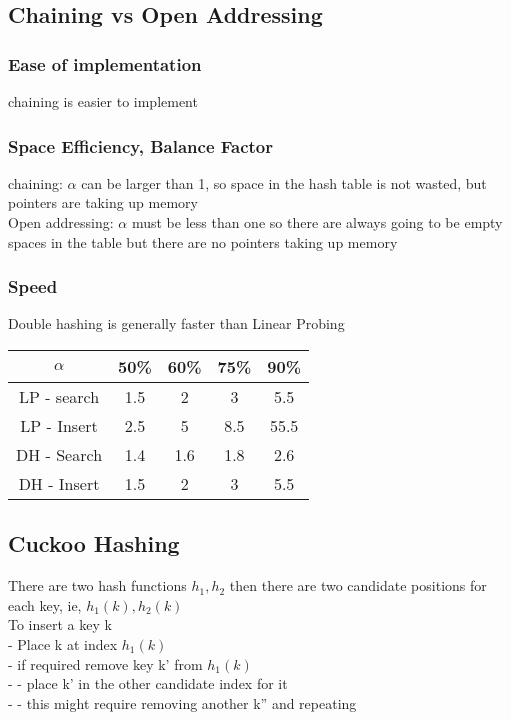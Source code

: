 \documentclass[12pt]{article}
\begin{document}
	\subsection*{Chaining vs Open Addressing}
	\subsubsection*{Ease of implementation}
	chaining is easier to implement
	\subsubsection*{Space Efficiency, Balance Factor}
	chaining: $\alpha$ can be larger than 1, so space in the hash table is not wasted, but pointers are taking up memory\\
	Open addressing: $\alpha$ must be less than one so there are always going to be empty spaces in the table but there are no pointers taking up memory\\
	
	\subsubsection{Speed}
	Double hashing is generally faster than Linear Probing\\
	
	\begin{tabular}{c | c | c | c | c}
		$\alpha$ & 50\% & 60\% & 75\% & 90\% \\ \hline
		LP - search & 1.5 & 2 & 3 & 5.5 \\
		LP - Insert & 2.5 & 5 & 8.5 & 55.5 \\
		DH - Search & 1.4 & 1.6 & 1.8 & 2.6 \\
		DH - Insert & 1.5 & 2 & 3 & 5.5 \\
	\end{tabular}
	
	\subsection*{Cuckoo Hashing}
	There are two hash functions $h_1, h_2$ then there are two candidate positions for each key, ie, $h_1(k), h_2(k)$\\
	
	To insert a key k\\
	- Place k at index $h_1(k)$\\
	- if required remove key k' from $h_1(k)$\\
	- - place k' in the other candidate index for it\\
	- - this might require removing another k'' and repeating\\
	
\end{document}
